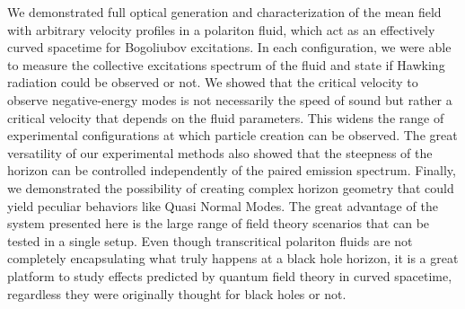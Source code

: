 We demonstrated full optical generation and characterization of the mean field with arbitrary velocity profiles in a polariton fluid, which act as an effectively curved spacetime for 
Bogoliubov excitations. In each configuration, we were able to measure the collective excitations spectrum of the fluid and state if Hawking radiation could be observed or not. We showed that the critical velocity to observe negative-energy modes is not necessarily the speed of sound but rather a critical velocity 
that depends on the fluid parameters. This widens the range of experimental configurations at which particle creation can be observed. The great versatility of our experimental methods also showed that the steepness of the horizon can be controlled independently of the paired emission spectrum.
Finally, we demonstrated the possibility of creating complex horizon geometry that could yield peculiar behaviors like Quasi Normal Modes. The great 
advantage of the system presented here is the large range of field theory scenarios that can be tested in a single setup. Even though
 transcritical polariton fluids are not completely encapsulating what truly happens at a black hole horizon, it is a great platform to study effects predicted by quantum field theory in curved spacetime, regardless they were
originally thought for black holes or not.


